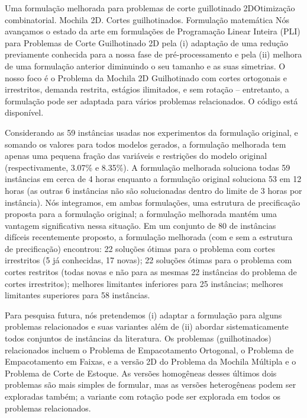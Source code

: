 \documentclass[ppgc,tese,english,formais,babel]{iiufrgs}
\begin{document}
\begin{englishabstract}{Uma formulação melhorada para problemas de corte guillotinado 2D}{Otimização combinatorial. Mochila 2D. Cortes guilhotinados. Formulação matemática}
Nós avançamos o estado da arte em formulações de Programação Linear Inteira (PLI) para Problemas de Corte Guilhotinado 2D pela (i) adaptação de uma redução previamente conhecida para a nossa fase de pré-processamento e pela (ii) melhora de uma formulação anterior diminuindo o seu tamanho e as suas simetrias.
O nosso foco é o Problema da Mochila 2D Guilhotinado com cortes ortogonais e irrestritos, demanda restrita, estágios ilimitados, e sem rotação -- entretanto, a formulação pode ser adaptada para vários problemas relacionados.
O código está disponível.

Considerando as 59 instâncias usadas nos experimentos da formulação original, e somando os valores para todos modelos gerados, a formulação melhorada tem apenas uma pequena fração das variáveis e restrições do modelo original (respectivamente, 3.07\% e 8.35\%).
A formulação melhorada soluciona todas 59 instâncias em cerca de 4 horas enquanto a formulação original soluciona 53 em 12 horas (as outras 6 instâncias não são solucionadas dentro do limite de 3 horas por instância).
Nós integramos, em ambas formulações, uma estrutura de precificação proposta para a formulação original; a formulação melhorada mantém uma vantagem significativa nessa situação.
Em um conjunto de 80 de instâncias difíceis recentemente proposto, a formulação melhorada (com e sem a estrutura de precificação) encontrou: 22 soluções ótimas para o problema com cortes irrestritos (5 já conhecidas, 17 novas); 22 soluções ótimas para o problema com cortes restritos (todas novas e não para as mesmas 22 instâncias do problema de cortes irrestritos); melhores limitantes inferiores para 25 instâncias; melhores limitantes superiores para 58 instâncias.

Para pesquisa futura, nós pretendemos (i) adaptar a formulação para alguns problemas relacionados e suas variantes além de (ii) abordar sistematicamente todos conjuntos de instâncias da literatura.
Os problemas (guilhotinados) relacionados incluem o Problema de Empacotamento Ortogonal, o Problema de Empacotamento em Faixas, e a versão 2D do Problema da Mochila Múltipla e o Problema de Corte de Estoque.
As versões homogêneas desses últimos dois problemas são mais simples de formular, mas as versões heterogêneas podem ser exploradas também; a variante com rotação pode ser explorada em todos os problemas relacionados.
\end{englishabstract}
\end{document}
